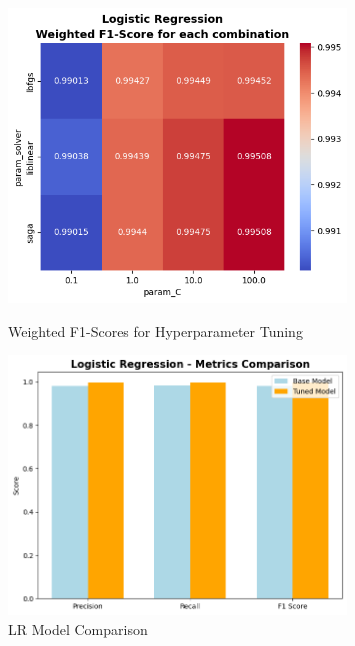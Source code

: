             \vspace{-0.1cm}
            
            \begin{figure}[h]
                \centering
                \begin{minipage}[c]{0.47\textwidth}
                    \centering
                    \includegraphics[width=0.8\textwidth]{../figures/plots/section2/weighted_f1_score_for_each_combination_of_parameters_logistic_regression.png}
                    \vspace{-0.15cm}
                    \caption{Weighted F1-Scores for Hyperparameter Tuning}
                    \label{fig:logistic_tuning}
                \end{minipage}
                \hfill
                \begin{minipage}[c]{0.47\textwidth}
                    \centering
                    \vspace{0.5cm}
                    \includegraphics[width=0.8\textwidth]{../figures/plots/section2/Logistic_Regression_Metric_comparison.png}
                    \caption{LR Model Comparison}
                    \label{fig:logistic_cm}
                \end{minipage}
            \end{figure}
    
